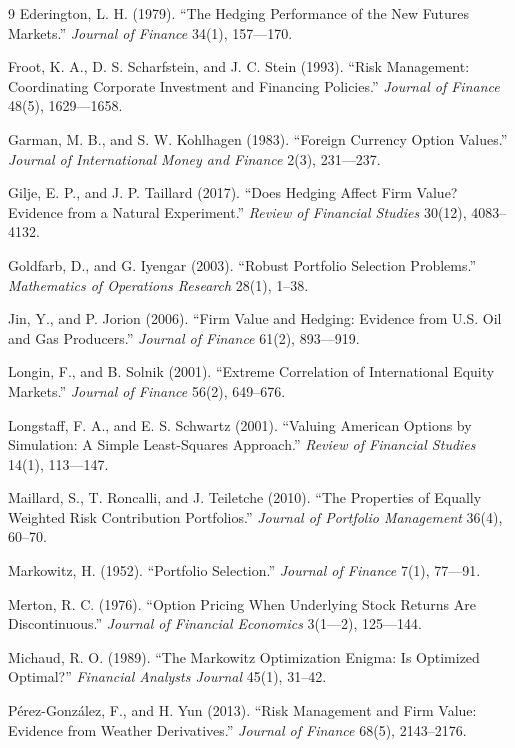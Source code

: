 \documentclass[11pt,a4paper]{article}
\begin{document}
\begin{thebibliography}{9}
 Ederington, L. H. (1979). ``The Hedging Performance of the New Futures Markets.'' \emph{Journal of Finance} 34(1), 157---170.

 Froot, K. A., D. S. Scharfstein, and J. C. Stein (1993). ``Risk Management: Coordinating Corporate Investment and Financing Policies.'' \emph{Journal of Finance} 48(5), 1629---1658.

 Garman, M. B., and S. W. Kohlhagen (1983). ``Foreign Currency Option Values.'' \emph{Journal of International Money and Finance} 2(3), 231---237.

 Gilje, E. P., and J. P. Taillard (2017). ``Does Hedging Affect Firm Value? Evidence from a Natural Experiment.'' \emph{Review of Financial Studies} 30(12), 4083--4132.

 Goldfarb, D., and G. Iyengar (2003). ``Robust Portfolio Selection Problems.'' \emph{Mathematics of Operations Research} 28(1), 1--38.

 Jin, Y., and P. Jorion (2006). ``Firm Value and Hedging: Evidence from U.S. Oil and Gas Producers.'' \emph{Journal of Finance} 61(2), 893---919.

 Longin, F., and B. Solnik (2001). ``Extreme Correlation of International Equity Markets.'' \emph{Journal of Finance} 56(2), 649--676.

 Longstaff, F. A., and E. S. Schwartz (2001). ``Valuing American Options by Simulation: A Simple Least-Squares Approach.'' \emph{Review of Financial Studies} 14(1), 113---147.

 Maillard, S., T. Roncalli, and J. Teiletche (2010). ``The Properties of Equally Weighted Risk Contribution Portfolios.'' \emph{Journal of Portfolio Management} 36(4), 60--70.

 Markowitz, H. (1952). ``Portfolio Selection.'' \emph{Journal of Finance} 7(1), 77---91.

 Merton, R. C. (1976). ``Option Pricing When Underlying Stock Returns Are Discontinuous.'' \emph{Journal of Financial Economics} 3(1---2), 125---144.

 Michaud, R. O. (1989). ``The Markowitz Optimization Enigma: Is Optimized Optimal?'' \emph{Financial Analysts Journal} 45(1), 31--42.


 P\'erez-Gonz\'alez, F., and H. Yun (2013). ``Risk Management and Firm Value: Evidence from Weather Derivatives.'' \emph{Journal of Finance} 68(5), 2143--2176.


\end{thebibliography}
\end{document}
